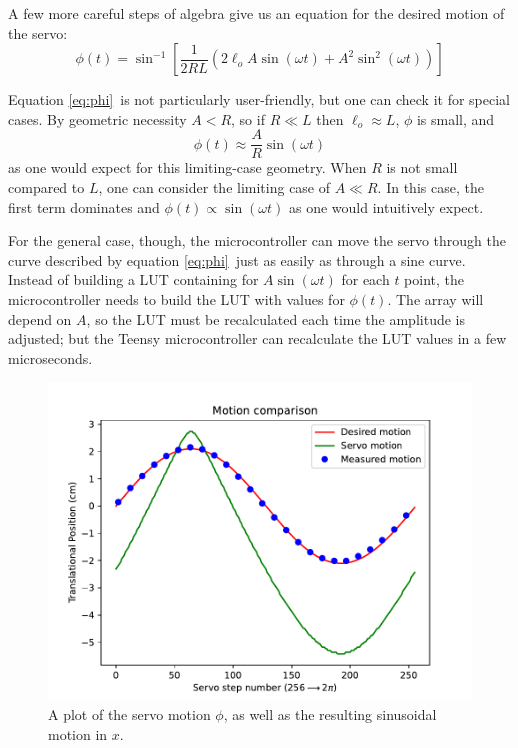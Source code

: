 \documentclass[11 pt]{article}
\begin{document}
A few more careful steps of algebra give us an equation for the desired motion of the servo:
\begin{equation} \label{eq:phi}
	\phi(t) = \sin^{-1} \left[\frac{1}{2RL}\left(2\ell_o A\sin(\omega t) + A^2 \sin^2(\omega t)\right)\right]
\end{equation}

Equation \ref{eq:phi}\ is not particularly user-friendly, but one can check it for special cases. 
By geometric necessity $A<R$, so if $R\ll L$ then $\ell_o \approx L$, $\phi$ is small, and 
\[ \phi(t) \approx \frac{A}{R}\sin(\omega t) \]
as one would expect for this limiting-case geometry.
When $R$ is not small compared to $L$, one can consider the limiting case of $A \ll R$. 
In this case, the first term dominates and $\phi(t) \propto \sin(\omega t)$ as one would intuitively expect. 

For the general case, though, the microcontroller can move the servo through the curve described by equation \ref{eq:phi}\ just as easily as through a sine curve. 
Instead of building a LUT containing for $A\sin(\omega t)$ for each $t$ point, the microcontroller needs to build the LUT with values for $\phi(t)$.
The array will depend on $A$, so the LUT must be recalculated each time the amplitude is adjusted; but the Teensy microcontroller can recalculate the LUT values in a few microseconds.

\begin{figure}[ht]
	\begin{center}
		\includegraphics{comparison}
	\end{center}
	\caption{A plot of the servo motion $\phi$, as well as the resulting sinusoidal motion in $x$.}
	\label{fig:motion}
\end{figure}
\end{document}
